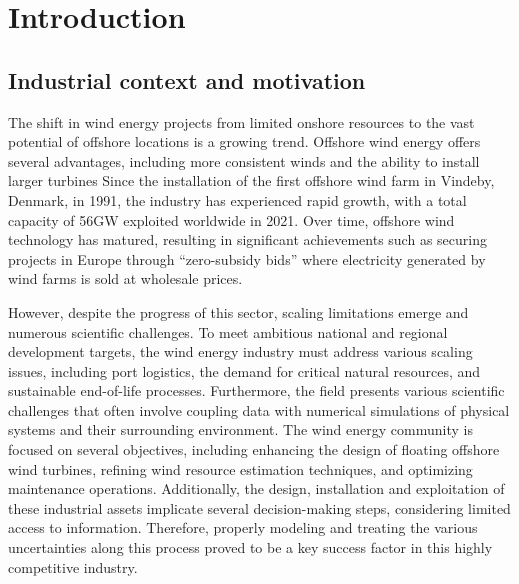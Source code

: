 \chapter*{Introduction}


\section*{Industrial context and motivation}

The shift in wind energy projects from limited onshore resources to the vast potential of offshore locations is a growing trend. 
Offshore wind energy offers several advantages, including more consistent winds and the ability to install larger turbines
Since the installation of the first offshore wind farm in Vindeby, Denmark, in 1991, the industry has experienced rapid growth, with a total capacity of 56GW exploited worldwide in 2021. 
Over time, offshore wind technology has matured, resulting in significant achievements such as securing projects in Europe through ``zero-subsidy bids'' where electricity generated by wind farms is sold at wholesale prices. 

However, despite the progress of this sector, scaling limitations emerge and numerous scientific challenges.
To meet ambitious national and regional development targets, the wind energy industry must address various scaling issues, including port logistics, the demand for critical natural resources, and sustainable end-of-life processes. 
Furthermore, the field presents various scientific challenges that often involve coupling data with numerical simulations of physical systems and their surrounding environment.
The wind energy community is focused on several objectives, including enhancing the design of floating offshore wind turbines, refining wind resource estimation techniques, and optimizing maintenance operations. 
Additionally, the design, installation and exploitation of these industrial assets implicate several decision-making steps, considering limited access to information.
Therefore, properly modeling and treating the various uncertainties along this process proved to be a key success factor in this highly competitive industry.

